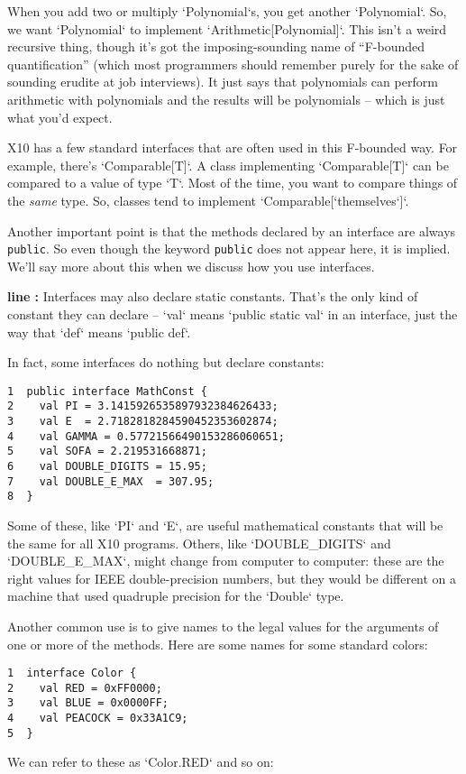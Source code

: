 \begin{description}
When you add two or multiply \xcd`Polynomial`s, you get another
\xcd`Polynomial`.  So, we want \xcd`Polynomial` to implement
\xcd`Arithmetic[Polynomial]`.  This isn't a weird recursive thing, though it's
got the imposing-sounding name of ``F-bounded quantification'' (which most
programmers should remember purely for the sake of sounding erudite at job
interviews).
It just  says that polynomials can perform arithmetic with polynomials and the
results will be polynomials -- which is just what you'd expect. 

X10 has a few standard interfaces that are often used in this F-bounded way.  
For example, there's \xcd`Comparable[T]`.  A class implementing
\xcd`Comparable[T]` can be compared to a value of type \xcd`T`.  Most of the
time, you want to compare things of the {\em same} type.  So, classes tend to
implement \xcd`Comparable[`themselves\xcd`]`. 

Another important point is that the methods declared by an interface are always
{\tt public}.  So even though the keyword {\tt public} does not appear here, it
is implied.  We'll say more about this when we discuss how you use interfaces.

\item {\bf line :} Interfaces may also declare static
      constants.  That's the only kind of constant they can declare --
      \xcd`val` means \xcd`public static val` in an interface, just the way
      that \xcd`def` means \xcd`public def`.  

In fact, some interfaces do nothing but declare constants: 
\begin{verbatim}
1  public interface MathConst {
2    val PI = 3.1415926535897932384626433;
3    val E  = 2.7182818284590452353602874;
4    val GAMMA = 0.57721566490153286060651;
5    val SOFA = 2.219531668871; 
6    val DOUBLE_DIGITS = 15.95; 
7    val DOUBLE_E_MAX  = 307.95;
8  } 
\end{verbatim}

Some of these, like \xcd`PI` and \xcd`E`, are useful mathematical constants
that will be the same for all X10 programs.   
Others, like \xcd`DOUBLE_DIGITS` and \xcd`DOUBLE_E_MAX`, might change from
computer to computer: these are the right values for IEEE double-precision
numbers, but they would be different on a machine that used quadruple
precision for the \xcd`Double` type.


Another common use is to give names to the legal values for
the arguments of one or more of the methods.  Here are some names for some
standard colors:
\begin{verbatim}
1  interface Color {
2    val RED = 0xFF0000;
3    val BLUE = 0x0000FF;
4    val PEACOCK = 0x33A1C9;
5  }
\end{verbatim}
We can refer to these as \xcd`Color.RED` and so on: 


\end{description}
